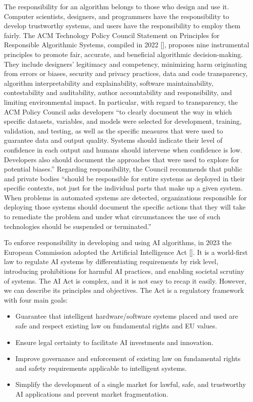 The responsibility for an algorithm belongs to those who design and use it. Computer scientists, designers, and programmers have the responsibility to develop trustworthy systems, and users have the responsibility to employ them fairly. The ACM Technology Policy Council Statement on Principles for Responsible Algorithmic Systems, compiled\vadjust{\pagebreak} in 2022 [\citealt{chap:7:ACMTechnologyPolicyCouncil:2022}], proposes nine instrumental principles to promote fair, accurate, and beneficial algorithmic decision-making. They include designers' legitimacy and competency, minimizing harm originating from errors or biases, security and privacy practices, data and code transparency, algorithm interpretability and explainability, software maintainability, contestability and auditability, author accountability and responsibility, and limiting environmental impact. In particular, with regard to transparency, the ACM Policy Council asks developers ``to clearly document the way in which specific datasets, variables, and models were selected for development, training, validation, and testing, as well as the specific measures that were used to guarantee data and output quality. Systems should indicate their level of confidence in each output and humans should intervene when confidence is low. Developers also should document the approaches that were used to explore for potential biases.'' Regarding responsibility, the Council recommends that public and private bodies ``should be responsible for entire systems as deployed in their specific contexts, not just for the individual parts that make up a given system. When problems in automated systems are detected, organizations responsible for deploying those systems should document the specific actions that they will take to remediate the problem and under what circumstances the use of such technologies should be suspended or terminated.''

To enforce responsibility in developing and using AI algorithms, in 2023 the European Commission adopted the Artificial Intelligence Act [\citealt{chap:7:EuropeanCommission:2023}]. It is a world-first law to regulate AI systems by differentiating requirements by risk level, introducing prohibitions for harmful AI practices, and enabling societal scrutiny of systems. The AI Act is complex, and it is not easy to recap it \hbox{easily.} However, we can describe its principles and objectives. The Act is a regulatory framework with four main goals:

\begin{itemize}
\item Guarantee that intelligent hardware/software systems placed and used are safe and respect existing law on fundamental rights and EU values.
\item Ensure legal certainty to facilitate AI investments and innovation.
\item Improve governance and enforcement of existing law on fundamental rights and safety requirements applicable to intelligent systems.
\item Simplify the development of a single market for lawful, safe, and trustworthy AI applications and prevent market fragmentation.
\end{itemize}

